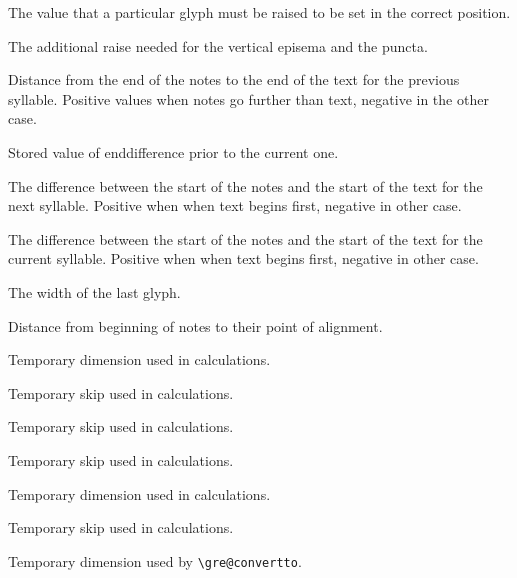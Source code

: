 The value that a particular glyph must be raised to be set in the correct position.

The additional raise needed for the vertical episema and the puncta.

Distance from the end of the notes to the end of the text for the previous syllable.  Positive values when notes go further than text, negative in the other case.

Stored value of enddifference prior to the current one.

The difference between the start of the notes and the start of the text for the next syllable.  Positive when when text begins first, negative in other case.

The difference between the start of the notes and the start of the text for the current syllable.  Positive when when text begins first, negative in other case.

The width of the last glyph.

Distance from beginning of notes to their point of alignment.

Temporary dimension used in calculations.

Temporary skip used in calculations.

Temporary skip used in calculations.

Temporary skip used in calculations.

Temporary dimension used in calculations.

Temporary skip used in calculations.

Temporary dimension used by \verb=\gre@convertto=.

